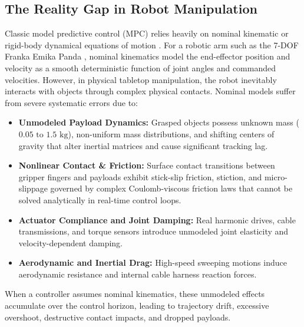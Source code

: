 \documentclass[10pt,a4paper]{article}
\begin{document}
\subsection{The Reality Gap in Robot Manipulation}
Classic model predictive control (MPC) relies heavily on nominal kinematic or rigid-body dynamical equations of motion \cite{rawlings2017model, mayne2000constrained}. For a robotic arm such as the 7-DOF Franka Emika Panda \cite{haddadin2024franka}, nominal kinematics model the end-effector position and velocity as a smooth deterministic function of joint angles and commanded velocities. However, in physical tabletop manipulation, the robot inevitably interacts with objects through complex physical contacts. Nominal models suffer from severe systematic errors due to:
\begin{itemize}
    \item \textbf{Unmodeled Payload Dynamics:} Grasped objects possess unknown mass ($0.05\text{ to }1.5\text{ kg}$), non-uniform mass distributions, and shifting centers of gravity that alter inertial matrices and cause significant tracking lag.
    \item \textbf{Nonlinear Contact \& Friction:} Surface contact transitions between gripper fingers and payloads exhibit stick-slip friction, stiction, and micro-slippage governed by complex Coulomb-viscous friction laws \cite{mason1986mechanics} that cannot be solved analytically in real-time control loops.
    \item \textbf{Actuator Compliance and Joint Damping:} Real harmonic drives, cable transmissions, and torque sensors introduce unmodeled joint elasticity and velocity-dependent damping.
    \item \textbf{Aerodynamic and Inertial Drag:} High-speed sweeping motions induce aerodynamic resistance and internal cable harness reaction forces.
\end{itemize}
When a controller assumes nominal kinematics, these unmodeled effects accumulate over the control horizon, leading to trajectory drift, excessive overshoot, destructive contact impacts, and dropped payloads.
\end{document}
